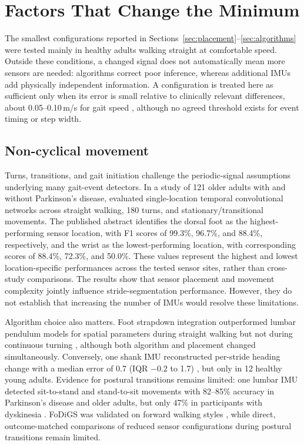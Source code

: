 \documentclass[10pt,a4paper,twocolumn]{article}
\begin{document}
\FloatBarrier

\section{Factors That Change the Minimum}
\label{sec:factors}

The smallest configurations reported in Sections~\ref{sec:placement}--\ref{sec:algorithms} were tested mainly in healthy adults walking straight at comfortable speed. Outside these conditions, a changed signal does not automatically mean more sensors are needed: algorithms correct poor inference, whereas additional IMUs add physically independent information. A configuration is treated here as sufficient only when its error is small relative to clinically relevant differences, about 0.05--0.10\,m/s for gait speed \citep{perera2006}, although no agreed threshold exists for event timing or step width.


\subsection{Non-cyclical movement}
\label{sec:noncyclical}

Turns, transitions, and gait initiation challenge the periodic-signal assumptions underlying many gait-event detectors. In a study of 121 older adults with and without Parkinson's disease, \citet{anderson2025} evaluated single-location temporal convolutional networks across straight walking, 180\textdegree{} turns, and stationary/transitional movements. The published abstract identifies the dorsal foot as the highest-performing sensor location, with F1 scores of 99.3\%, 96.7\%, and 88.4\%, respectively, and the wrist as the lowest-performing location, with corresponding scores of 88.4\%, 72.3\%, and 50.0\%. These values represent the highest and lowest location-specific performances across the tested sensor sites, rather than cross-study comparisons. The results show that sensor placement and movement complexity jointly influence stride-segmentation performance. However, they do not establish that increasing the number of IMUs would resolve these limitations.

Algorithm choice also matters. Foot strapdown integration outperformed lumbar pendulum models for spatial parameters during straight walking but not during continuous turning \citep{kvist2024}, although both algorithm and placement changed simultaneously. Conversely, one shank IMU reconstructed per-stride heading change with a median error of 0.7\textdegree{} (IQR $-0.2$ to 1.7\textdegree{}) \citep{uchitomi2022}, but only in 12 healthy young adults. Evidence for postural transitions remains limited: one lumbar IMU detected sit-to-stand and stand-to-sit movements with 82--85\% accuracy in Parkinson's disease and older adults, but only 47\% in participants with dyskinesia \citep{pham2018}. FoDiGS was validated on forward walking styles \citep{ruizruiz2024}, while direct, outcome-matched comparisons of reduced sensor configurations during postural transitions remain limited.
\end{document}
